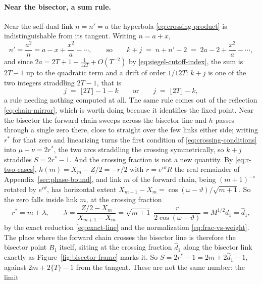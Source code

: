 \documentclass[11pt]{article}
\theoremstyle{definition}
\begin{document}
\paragraph{Near the bisector, a sum rule.} Near the self-dual link $n=n'=a$ the
hyperbola \eqref{eq:crossing-product} is indistinguishable from its tangent.
Writing $n=a+x$,
\begin{equation}\label{eq:crossing-tangent}
n'=\frac{a^{2}}{n}=a-x+\frac{x^{2}}{a}-\cdots ,
\qquad\text{so}\qquad
k+j\;=\;n+n'-2\;=\;2a-2+\frac{x^{2}}{a}-\cdots ,
\end{equation}
and since $2a=2T+1-\tfrac1{12T}+O(T^{-2})$ by
\eqref{eq:siegel-cutoff-index}, the sum is $2T-1$ up to the quadratic term and
a drift of order $1/12T$: $k+j$ is one of the two integers straddling $2T-1$,
that is
\begin{equation}\label{eq:crossing-sum}
j\;=\;\lfloor2T\rfloor-1-k
\qquad\text{or}\qquad
j\;=\;\lfloor2T\rfloor-k ,
\end{equation}
a rule needing nothing computed at all. The same rule comes out of the reflection
\eqref{eq:chain-mirror}, which is worth doing because it identifies the fixed
point. Near the bisector the
forward chain sweeps across the bisector line and $h$ passes through a single
zero there, close to straight over the few links either side; writing $r^{*}$
for that zero and linearizing turns the first condition of
\eqref{eq:crossing-conditions} into $\mu+\nu=2r^{*}$, the two arcs straddling
the crossing symmetrically, so $k+j$ straddles $S=2r^{*}-1$. And the crossing
fraction is not a new quantity.
By \eqref{eq:r-two-cases}, $h(m)=X_m-Z/2=-r/2$ with $r=e^{i\vartheta}R$ the real
remainder of Appendix~\ref{sec:phase-bound}, and link $m$ of the forward chain,
being $(m+1)^{-s}$ rotated by $e^{i\vartheta}$, has horizontal extent
$X_{m+1}-X_m=\cos(\omega-\vartheta)/\sqrt{m+1}$. So the zero falls inside link
$m$, at the crossing fraction
\begin{equation}\label{eq:crossing-rstar}
r^{*}=m+\lambda,
\qquad
\lambda=\frac{Z/2-X_m}{X_{m+1}-X_m}
=\sqrt{m+1}\;\frac{r}{2\cos(\omega-\vartheta)}
=M^{1/2}d_1=\hat d_1,
\end{equation}
by the exact reduction \eqref{eq:exact-line} and the normalization
\eqref{eq:frac-vs-weight}. The place where the forward chain crosses the bisector
line is therefore the bisector point $B_1$ itself, sitting at the crossing
fraction $\hat d_1$ along the bisector link exactly as
Figure~\ref{fig:bisector-frame} marks it. So $S=2r^{*}-1=2m+2\hat d_1-1$,
against $2m+2\{T\}-1$ from the tangent. These are not the same number: the limit
\end{document}
